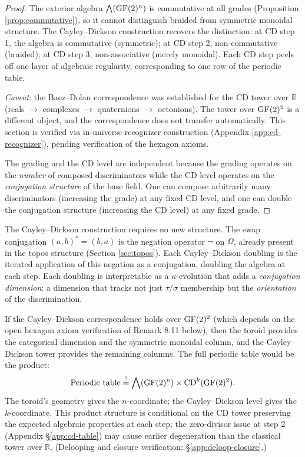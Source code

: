 \begin{proof}
The exterior algebra $\bigwedge(\operatorname{GF}(2)^n)$ is commutative
at all grades (Proposition \ref{prop:commutative}), so
it cannot distinguish braided from symmetric monoidal
structure. The Cayley--Dickson construction recovers the
distinction: at CD step 1, the algebra is commutative
(symmetric); at CD step 2, non-commutative (braided); at
CD step 3, non-associative (merely monoidal). Each CD step
peels off one layer of algebraic regularity, corresponding
to one row of the periodic table.

\emph{Caveat}: the Baez--Dolan correspondence was
established for the CD tower over $\mathbb{R}$
(reals $\to$ complexes $\to$ quaternions $\to$
octonions). The tower over $\operatorname{GF}(2)^2$ is a different
object, and the correspondence does not transfer
automatically. This section is verified via in-universe recognizer
construction (Appendix \ref{app:cd-recognizer}), pending
verification of the hexagon axioms.

The grading and the CD level are independent because the
grading operates on the \emph{number} of composed
discriminators while the CD level operates on the
\emph{conjugation structure} of the base field. One can
compose arbitrarily many discriminators (increasing the
grade) at any fixed CD level, and one can double the
conjugation structure (increasing the CD level) at any
fixed grade.
\end{proof}  %

\begin{remark}
The Cayley--Dickson construction requires no new
structure. The swap conjugation $(a,b)^* = (b,a)$ is the
negation operator $\neg$ on $\Omega$, already present in
the topos structure (Section \ref{sec:topos}). Each
Cayley--Dickson doubling is the iterated application of
this negation as a conjugation, doubling the algebra at
each step. Each doubling is interpretable as a
$\kappa$-evolution that adds a \emph{conjugation dimension}:
a dimension that tracks not just $\tau/\sigma$ membership
but the \emph{orientation} of the discrimination.
\end{remark}

\begin{remark}
If the Cayley--Dickson correspondence holds over
$\operatorname{GF}(2)^2$ (which depends on the open hexagon axiom
verification of Remark 8.11 below), then
the toroid provides the categorical
dimension and the symmetric monoidal column, and the
Cayley--Dickson tower provides the remaining columns.
The full periodic table would be the product:
\[
  \text{Periodic table} \stackrel{?}{=} \bigwedge(\operatorname{GF}(2)^n)
  \times \mathrm{CD}^k(\operatorname{GF}(2)^2).
\]
The toroid's geometry gives the $n$-coordinate; the
Cayley--Dickson level gives the $k$-coordinate.
This product structure is conditional on the CD tower
preserving the expected algebraic properties at each
step; the zero-divisor issue at step 2 (Appendix
\S\ref{app:cd-table}) may cause earlier degeneration
than the classical tower over $\mathbb{R}$.
(Delooping and closure verification: \S\ref{app:deloop-closure}.)
\end{remark}

